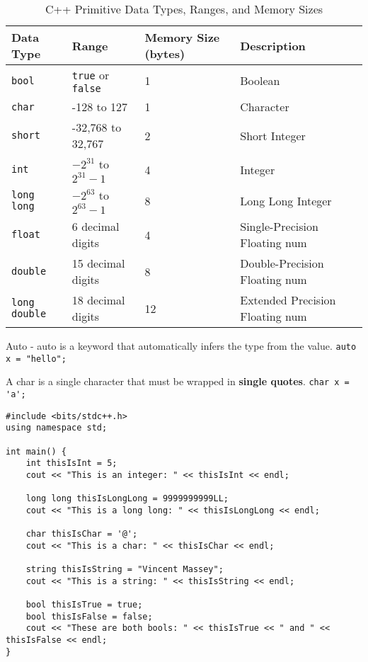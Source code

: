 \documentclass{report}
\begin{document}
\begin{table}[ht]
    \centering
    \begin{center}
    \begin{tabular}{llll}
        \toprule
        Data Type & Range & Memory Size (bytes) & Description \\
        \midrule
        \texttt{bool} & \texttt{true} or \texttt{false} & 1 & Boolean \\
        \texttt{char} & -128 to 127 & 1 & Character \\
        \texttt{short} & -32,768 to 32,767 & 2 & Short Integer \\
        \texttt{int} & $-2^{31}$ to $2^{31}-1$ & 4 & Integer \\
        \texttt{long long} & $-2^{63}$ to $2^{63}-1$ & 8 & Long Long Integer \\
        \texttt{float} & 6 decimal digits & 4 & Single-Precision Floating num \\
        \texttt{double} & 15 decimal digits & 8 & Double-Precision Floating num \\
        \texttt{long double} & 18 decimal digits & 12 & Extended Precision Floating num \\
        \bottomrule
    \end{tabular}
    \end{center}
    \caption{C++ Primitive Data Types, Ranges, and Memory Sizes}
    \label{tab:data-types}
\end{table}

\begin{principle}
    Auto - auto is a keyword that automatically infers the type from the value. \lstinline{auto x = "hello";}
\end{principle}

\begin{principle}
    A char is a single character that must be wrapped in \textbf{single quotes}. \lstinline{char x = 'a';}
\end{principle}

\begin{lstlisting}[caption=Types]
#include <bits/stdc++.h>
using namespace std;

int main() {
    int thisIsInt = 5;
    cout << "This is an integer: " << thisIsInt << endl;

    long long thisIsLongLong = 9999999999LL;
    cout << "This is a long long: " << thisIsLongLong << endl;

    char thisIsChar = '@';
    cout << "This is a char: " << thisIsChar << endl;

    string thisIsString = "Vincent Massey";
    cout << "This is a string: " << thisIsString << endl;

    bool thisIsTrue = true;
    bool thisIsFalse = false;
    cout << "These are both bools: " << thisIsTrue << " and " << thisIsFalse << endl; 
}
\end{lstlisting}
\end{document}
